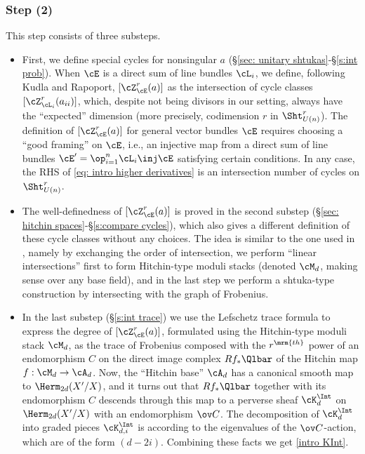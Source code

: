 \subsubsection{Step (2)} This step consists of three substeps.
\begin{itemize}
\item First, we define special cycles for nonsingular $a$ (\S\ref{sec: unitary shtukas}-\S\ref{s:int prob}). When $\cE$ is a direct sum of line bundles $\cL_{i}$, we define, following Kudla and Rapoport, $[\cZ_{\cE}^{r}(a)]$ as the intersection of cycle classes $[\cZ_{\cL_{i}}^{r}(a_{ii})]$, which, despite not being divisors in our setting, always have the ``expected'' dimension (more precisely, codimension $r$ in $\Sht^{r}_{U(n)}$). The definition of $[\cZ^{r}_{\cE}(a)]$ for general vector bundles $\cE$ requires choosing a ``good framing'' on $\cE$, i.e., an injective map from a direct sum of line bundles $\cE'=\op_{i=1}^{n}\cL_{i}\inj \cE$ satisfying certain conditions.  In any case, the RHS of \eqref{eq: intro higher derivatives} is an intersection number of cycles on $\Sht^{r}_{U(n)}$.
\item The well-definedness of $[\cZ^{r}_{\cE}(a)]$ is proved in the second substep (\S\ref{sec: hitchin spaces}-\S\ref{s:compare cycles}), which also gives a different definition of these cycle classes without any choices. The idea is similar to the one used in \cite{YZ}, namely by exchanging the order of intersection, we perform ``linear intersections'' first to form Hitchin-type moduli stacks (denoted $\cM_{d}$, making sense over any base field), and in the last step we perform a shtuka-type construction by intersecting with the graph of Frobenius.
\item In the last substep (\S\ref{s:int trace}) we use the Lefschetz trace formula to express the degree of $[\cZ^{r}_{\cE}(a)]$, formulated using the Hitchin-type moduli stack $\cM_{d}$, as the trace of Frobenius composed with the $r^{\mrm{th}}$ power of an endomorphism $C$ on the direct image complex $Rf_{*}\Qlbar$ of the Hitchin map  $f:\cM_{d}\to \cA_{d}$. Now, the ``Hitchin base'' $\cA_d$ has a canonical smooth map to $\Herm_{2d}(X'/X)$, and it turns out that $Rf_{*}\Qlbar$ together with its endomorphism $C$ descends through this map to a perverse sheaf $\cK^{\Int}_{d}$ on $\Herm_{2d}(X'/X)$ with an endomorphism $\ov C$. The decomposition of $\cK^{\Int}_{d}$ into graded pieces $\cK^{\Int}_{d,i}$ is according to the eigenvalues of the $\ov C$-action, which are of the form $(d-2i)$. Combining these facts we get \eqref{intro KInt}.
\end{itemize}

